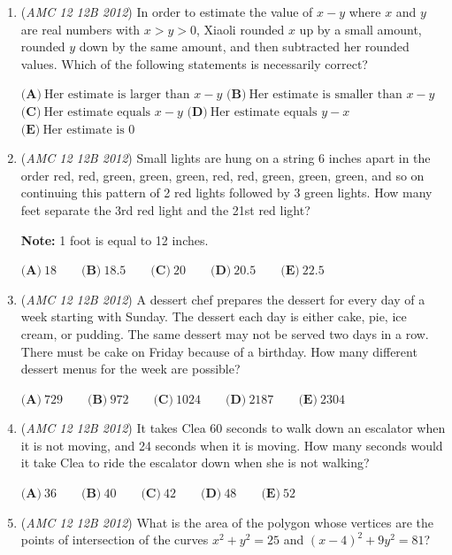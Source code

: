 \begin{enumerate}
 $\textbf{(A)}\ 1\qquad\textbf{(B)}\ 2\qquad\textbf{(C)}\ 3\qquad\textbf{(D)}\ 4\qquad\textbf{(E)}\ 5$


	\item (\textit{AMC 12 12B 2012}) In order to estimate the value of $x-y$ where $x$ and $y$ are real numbers with $x > y > 0$, Xiaoli rounded $x$ up by a small amount, rounded $y$ down by the same amount, and then subtracted her rounded values. Which of the following statements is necessarily correct?


 $\textbf{(A)}\ \text{Her estimate is larger than }x-y$
$\textbf{(B)}\ \text{Her estimate is smaller than }x-y$
$\textbf{(C)}\ \text{Her estimate equals }x-y$
$\textbf{(D)}\ \text{Her estimate equals }y - x$
$\textbf{(E)}\ \text{Her estimate is 0}$


	\item (\textit{AMC 12 12B 2012}) Small lights are hung on a string 6 inches apart in the order red, red, green, green, green, red, red, green, green, green, and so on continuing this pattern of 2 red lights followed by 3 green lights. How many feet separate the 3rd red light and the 21st red light?


 \textbf{Note:} 1 foot is equal to 12 inches.


 $\textbf{(A)}\ 18\qquad\textbf{(B)}\ 18.5\qquad\textbf{(C)}\ 20\qquad\textbf{(D)}\ 20.5\qquad\textbf{(E)}\ 22.5$


	\item (\textit{AMC 12 12B 2012}) A dessert chef prepares the dessert for every day of a week starting with Sunday. The dessert each day is either cake, pie, ice cream, or pudding. The same dessert may not be served two days in a row. There must be cake on Friday because of a birthday. How many different dessert menus for the week are possible?


 $\textbf{(A)}\ 729\qquad\textbf{(B)}\ 972\qquad\textbf{(C)}\ 1024\qquad\textbf{(D)}\ 2187\qquad\textbf{(E)}\ 2304$


	\item (\textit{AMC 12 12B 2012}) It takes Clea 60 seconds to walk down an escalator when it is not moving, and 24 seconds when it is moving. How many seconds would it take Clea to ride the escalator down when she is not walking?


 $\textbf{(A)}\ 36\qquad\textbf{(B)}\ 40\qquad\textbf{(C)}\ 42\qquad\textbf{(D)}\ 48\qquad\textbf{(E)}\ 52$


	\item (\textit{AMC 12 12B 2012}) What is the area of the polygon whose vertices are the points of intersection of the curves $x^2 + y^2 =25$ and $(x-4)^2 + 9y^2 = 81$?



\end{enumerate}
